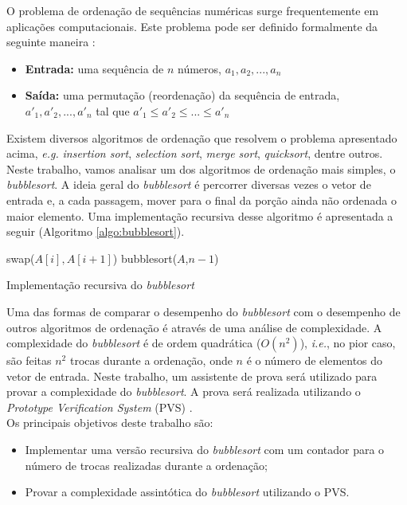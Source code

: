 \indent \indent O problema de ordenação de sequências numéricas surge frequentemente em aplicações computacionais. Este problema pode ser definido formalmente da seguinte maneira \cite{cormen2009introduction}:
\begin{itemize}
    \item \textbf{Entrada:} uma sequência de $n$ números, $a_1, a_2, ..., a_n$
    \item \textbf{Saída:} uma permutação (reordenação) da sequência de entrada, $a'_1, a'_2,...,a'_n$ tal que $a'_1 \leq a'_2 \leq ... \leq a'_n$ 
\end{itemize}

Existem diversos algoritmos de ordenação que resolvem o problema apresentado acima, \textit{e.g.} \textit{insertion sort}, \textit{selection sort}, \textit{merge sort}, \textit{quicksort}, dentre outros. Neste trabalho, vamos analisar um dos algoritmos de ordenação mais simples, o \textit{bubblesort}. A ideia geral do \textit{bubblesort} é percorrer diversas vezes o vetor de entrada e, a cada passagem, mover para o final da porção ainda não ordenada o maior elemento. Uma implementação recursiva desse algoritmo é apresentada a seguir (Algoritmo \ref{algo:bubblesort}).

\begin{algorithm}[!h]
    \begin{algorithmic}[1]
                \State \Return
            \EndIf
                    \State swap($A[i], A[i+1]$)
                \EndIf
            \EndFor
            \State bubblesort($A$,$n-1$)
            
        
        \EndFunction
    \end{algorithmic}\vspace{-2pt}
    \caption{Implementação recursiva do \textit{bubblesort}}
    \label{algo:bubblesort}
\end{algorithm}

Uma das formas de comparar o desempenho do \textit{bubblesort} com o desempenho de outros algoritmos de ordenação é através de uma análise de complexidade.
A complexidade do \textit{bubblesort} é de ordem quadrática ($O(n^2)$), \textit{i.e.}, no pior caso, são feitas $n^2$ trocas durante a ordenação, onde $n$ é o número de elementos do vetor de entrada.
Neste trabalho, um assistente de prova será utilizado para provar a complexidade do \textit{bubblesort}. 
A prova será realizada utilizando o \textit{Prototype Verification System} (PVS) \cite{owre1992pvs}. \\

Os principais objetivos deste trabalho são:
\begin{itemize}
    \item Implementar uma versão recursiva do \textit{bubblesort} com um contador para o número de trocas realizadas durante a ordenação;
    \item Provar a complexidade assintótica do \textit{bubblesort} utilizando o PVS.
\end{itemize}

